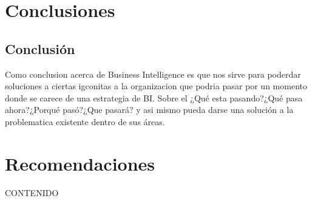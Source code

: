 \documentclass[preprint,12pt]{elsarticle}
\begin{document}




\section{Conclusiones}
\subsection{Conclusión }	
Como conclusion acerca de Business Intelligence es que nos sirve para poderdar soluciones a ciertas igconitas a la organizacion que 
podria pasar por un momento donde se carece de una estrategia de BI.
Sobre el ¿Qué esta pasando?¿Qué pasa ahora?¿Porqué pasó?¿Que pasará? y asi mismo pueda darse una solución a la problematica 
existente dentro de sus áreas.





\section{Recomendaciones}	
CONTENIDO






	
	\newpage
	
		
\end{document}
